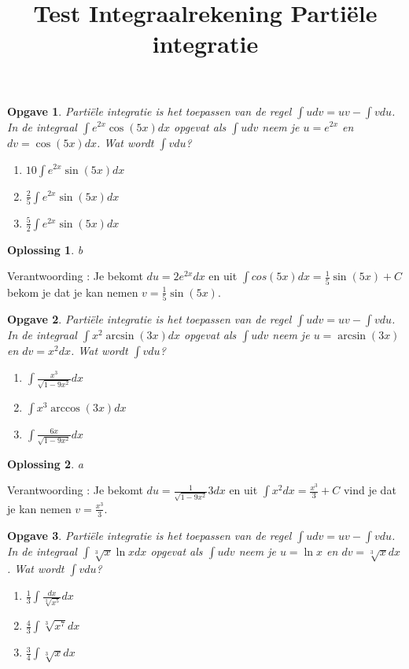 \documentclass{article}
\title{Test Integraalrekening Parti\"ele integratie}
\date { }
\newtheorem{opgave}{Opgave}
\newtheorem*{oplossing}{Oplossing}
\begin{document}
\maketitle \noindent

\begin{opgave}
Parti\"ele integratie is het toepassen van de regel $\int udv = uv - \int vdu$.
In de integraal $\int e^{2x}\cos (5x)dx$ opgevat als $\int udv$ neem je $u=e^{2x}$ en $dv=\cos (5x)dx$.
Wat wordt $\int vdu$?

\vspace{2mm}
\begin{enumerate}[a]
\item $10\int e^{2x}\sin (5x)dx$
\item $\frac{2}{5} \int e^{2x}\sin (5x) dx$
\item $\frac{5}{2} \int e^{2x}\sin (5x)dx$
\end{enumerate}
\end{opgave}

 \begin{oplossing}
b
\end{oplossing}

Verantwoording : Je bekomt $du=2e^{2x}dx$ en uit $\int cos (5x)dx=\frac{1}{5} \sin (5x)+C$ bekom je dat je kan nemen $v=\frac{1}{5} \sin (5x)$.

\begin{opgave}
Parti\"ele integratie is het toepassen van de regel $\int udv = uv - \int vdu$.
In de integraal $\int x^2 \arcsin (3x)dx$ opgevat als $\int udv$ neem je $u=\arcsin (3x)$ en $dv=x^2 dx$.
Wat wordt $\int vdu$?

\begin{enumerate}[a]
\item $\int \frac {x^3}{\sqrt{1-9x^2}}dx$
\item $\int x^3 \arccos (3x) dx$
\item $\int \frac{6x}{\sqrt {1-9x^2}}dx$
\end{enumerate}
\end{opgave}

\begin{oplossing}
a
\end{oplossing}

Verantwoording : Je bekomt $du = \frac{1}{\sqrt {1-9x^2}}3dx$ en uit $\int x^2dx=\frac {x^3}{3}+C$ vind je dat je kan nemen $v=\frac {x^3}{3}$.

\begin{opgave}
Parti\"ele integratie is het toepassen van de regel $\int udv = uv - \int vdu$.
In de integraal $\int \sqrt[3]{x}\ln xdx$ opgevat als $\int udv$ neem je $u=\ln x$ en $dv=\sqrt[3]{x}dx$.
Wat wordt $\int vdu$?

\begin{enumerate}[a]
\item $\frac{1}{3} \int \frac {dx}{\sqrt[3]{x^5}}dx$
\item $\frac{4}{3} \int \sqrt[3]{x^7}dx$
\item $\frac{3}{4} \int \sqrt[3]{x} dx$
\end{enumerate}


\end{opgave}
\end{document}
